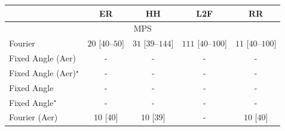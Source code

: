 \begin{tabular}{l|cccc|}
\toprule
            & ER & HH & L2F & RR \\
\midrule
\multicolumn{5}{c}{\rule{0pt}{8pt}MPS} \\
\midrule
Fourier & {\cellcolor[HTML]{F5FBF3}} \color[HTML]{000000} $20$ [$40$--$50$] & {\cellcolor[HTML]{F2FAF0}} \color[HTML]{000000} $31$ [$39$--$144$] & {\cellcolor[HTML]{DFF3DA}} \color[HTML]{000000} $111$ [$40$--$100$] & {\cellcolor[HTML]{F7FCF5}} \color[HTML]{000000} $11$ [$40$--$100$] \\
Fixed Angle (Aer) & {\cellcolor[HTML]{000000}} \color[HTML]{F1F1F1} {\cellcolor{white}} \color{black} - & {\cellcolor[HTML]{000000}} \color[HTML]{F1F1F1} {\cellcolor{white}} \color{black} - & {\cellcolor[HTML]{000000}} \color[HTML]{F1F1F1} {\cellcolor{white}} \color{black} - & {\cellcolor[HTML]{000000}} \color[HTML]{F1F1F1} {\cellcolor{white}} \color{black} - \\
Fixed Angle (Aer)$^\star$ & {\cellcolor[HTML]{000000}} \color[HTML]{F1F1F1} {\cellcolor{white}} \color{black} - & {\cellcolor[HTML]{000000}} \color[HTML]{F1F1F1} {\cellcolor{white}} \color{black} - & {\cellcolor[HTML]{000000}} \color[HTML]{F1F1F1} {\cellcolor{white}} \color{black} - & {\cellcolor[HTML]{000000}} \color[HTML]{F1F1F1} {\cellcolor{white}} \color{black} - \\
Fixed Angle & {\cellcolor[HTML]{000000}} \color[HTML]{F1F1F1} {\cellcolor{white}} \color{black} - & {\cellcolor[HTML]{000000}} \color[HTML]{F1F1F1} {\cellcolor{white}} \color{black} - & {\cellcolor[HTML]{000000}} \color[HTML]{F1F1F1} {\cellcolor{white}} \color{black} - & {\cellcolor[HTML]{000000}} \color[HTML]{F1F1F1} {\cellcolor{white}} \color{black} - \\
Fixed Angle$^\star$ & {\cellcolor[HTML]{000000}} \color[HTML]{F1F1F1} {\cellcolor{white}} \color{black} - & {\cellcolor[HTML]{000000}} \color[HTML]{F1F1F1} {\cellcolor{white}} \color{black} - & {\cellcolor[HTML]{000000}} \color[HTML]{F1F1F1} {\cellcolor{white}} \color{black} - & {\cellcolor[HTML]{000000}} \color[HTML]{F1F1F1} {\cellcolor{white}} \color{black} - \\
Fourier (Aer) & {\cellcolor[HTML]{F7FCF5}} \color[HTML]{000000} $10$ [$40$] & {\cellcolor[HTML]{F7FCF5}} \color[HTML]{000000} $10$ [$39$] & {\cellcolor[HTML]{000000}} \color[HTML]{F1F1F1} {\cellcolor{white}} \color{black} - & {\cellcolor[HTML]{F7FCF5}} \color[HTML]{000000} $10$ [$40$] \\

\end{tabular}
